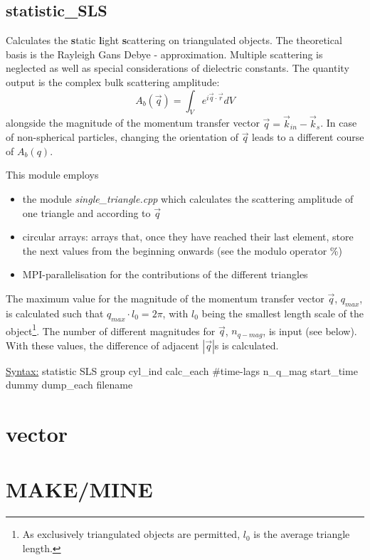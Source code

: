 \documentclass[a4paper,10pt]{scrreprt}
\begin{document}
\subsection{statistic\_SLS}

Calculates the \textbf{s}tatic \textbf{l}ight \textbf{s}cattering on triangulated objects. The theoretical basis is the Rayleigh Gans Debye - approximation. Multiple scattering is neglected as well as special considerations of dielectric constants. The quantity output is the complex bulk scattering amplitude:
%
\begin{equation}
\label{eq:SLS}
A_b(\vec{q})=\int_V e^{i\vec{q} \cdot \vec{r}} dV
\end{equation}
%
alongside the magnitude of the momentum transfer vector $\vec{q} = \vec{k}_{in} - \vec{k}_{s}$. In case of non-spherical particles, changing the orientation of $\vec{q}$ leads to a different course of $A_b(q)$.

This module employs
%
\begin{itemize}
\item the module \textit{single\_triangle.cpp} which calculates the scattering amplitude of one triangle and according to $\vec{q}$
\item circular arrays: arrays that, once they have reached their last element, store the next values from the beginning onwards (see the modulo operator \%)
\item MPI-parallelisation for the contributions of the different triangles
\end{itemize}
%
The maximum value for the magnitude of the momentum transfer vector $\vec{q}$, $q_{max}$, is calculated such that $q_{max} \cdot l_0 = 2 \pi$, with $l_0$ being the smallest length scale of the object\footnote{As exclusively triangulated objects are permitted, $l_0$ is the average triangle length.}. The number of different magnitudes for $\vec{q}$, $n_{q-mag}$, is input (see below). With these values, the difference of adjacent $|\vec{q}|$s is calculated.

\underline{Syntax:} statistic	SLS group cyl\_ind calc\_each \#time-lags n\_q\_mag start\_time dummy dump\_each filename

\section{vector}


\section{MAKE/MINE}
\end{document}
